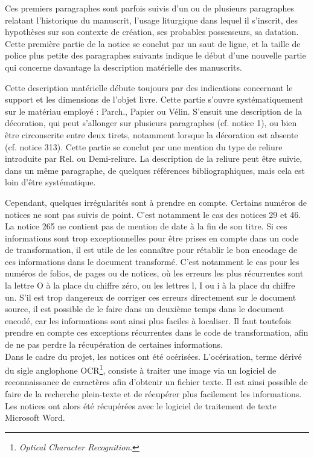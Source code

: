 \documentclass[a4paper,12pt,twoside]{book}
\begin{document}
	Ces premiers paragraphes sont parfois suivis d'un ou de plusieurs paragraphes relatant l'historique du manuscrit, l'usage liturgique dans lequel il s'inscrit, des hypothèses sur son contexte de création, ses probables possesseurs, sa datation. Cette première partie de la notice se conclut par un saut de ligne, et la taille de police plus petite des paragraphes suivants indique le début d'une nouvelle partie qui concerne davantage la description matérielle des manuscrits. 
	
	Cette description matérielle débute toujours par des indications concernant le support et les dimensions de l'objet livre. Cette partie s'ouvre systématiquement sur le matériau employé : \og Parch.\fg{}, \og Papier\fg{} ou \og Vélin\fg{}. S'ensuit une description de la décoration, qui peut s'allonger sur plusieurs paragraphes (cf. notice 1), ou bien être circonscrite entre deux tirets, notamment lorsque la décoration est absente (cf. notice 313). Cette partie se conclut par une mention du type de reliure introduite par \og Rel.\fg{} ou \og Demi-reliure\fg{}. La description de la reliure peut être suivie, dans un même paragraphe, de quelques références bibliographiques, mais cela est loin d'être systématique. 
	
	Cependant, quelques irrégularités sont à prendre en compte. Certains numéros de notices ne sont pas suivis de point. C'est notamment le cas des notices 29 et 46. La notice 265 ne contient pas de mention de date à la fin de son titre. Si ces informations sont trop exceptionnelles pour être prises en compte dans un code de transformation, il est utile de les connaître pour rétablir le bon encodage de ces informations dans le document transformé. C'est notamment le cas pour les numéros de folios, de pages ou de notices, où les erreurs les plus récurrentes sont la lettre \og O\fg{} à la place du chiffre zéro, ou les lettres \og l\fg{}, \og I\fg{} ou \og i\fg{} à la place du chiffre un. S'il est trop dangereux de corriger ces erreurs directement sur le document source, il est possible de le faire dans un deuxième temps dans le document encodé, car les informations sont ainsi plus faciles à localiser. Il faut toutefois prendre en compte ces exceptions récurrentes dans le code de transformation, afin de ne pas perdre la récupération de certaines informations.\\
	
	Dans le cadre du projet, les notices ont été océrisées. L'océrisation, terme dérivé du sigle anglophone OCR\footnote{\textit{Optical Character Recognition}.}, consiste à traiter une image via un logiciel de reconnaissance de caractères afin d'obtenir un fichier texte. Il est ainsi possible de faire de la recherche plein-texte et de récupérer plus facilement les informations. Les notices ont alors été récupérées avec le logiciel de traitement de texte Microsoft Word. 
	
\end{document}

